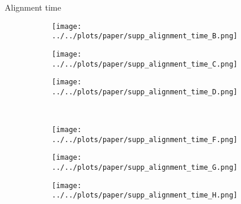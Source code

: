 \documentclass{beamer}
\begin{document}
\appendix
\begin{frame}{Alignment time}
\begin{figure}
\centering
\begin{subfigure}[t]{0.3\textwidth}
\texttt{[image: ../../plots/paper/supp\_alignment\_time\_B.png]}
\end{subfigure}%
\begin{subfigure}[t]{0.3\textwidth}
\texttt{[image: ../../plots/paper/supp\_alignment\_time\_C.png]}
\end{subfigure}%
\begin{subfigure}[t]{0.4\textwidth}
\texttt{[image: ../../plots/paper/supp\_alignment\_time\_D.png]}
\end{subfigure}\\
\begin{subfigure}[t]{0.3\textwidth}
\texttt{[image: ../../plots/paper/supp\_alignment\_time\_F.png]}
\end{subfigure}%
\begin{subfigure}[t]{0.3\textwidth}
\texttt{[image: ../../plots/paper/supp\_alignment\_time\_G.png]}
\end{subfigure}%
\begin{subfigure}[t]{0.4\textwidth}
\texttt{[image: ../../plots/paper/supp\_alignment\_time\_H.png]}
\end{subfigure}
\end{figure}

\end{frame}
\end{document}
